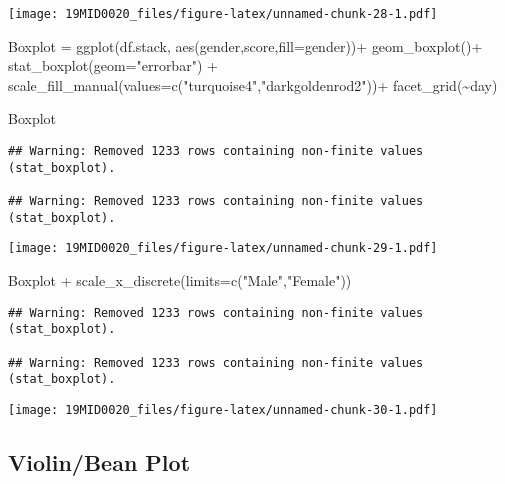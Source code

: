 \documentclass[
]{article}
\newenvironment{Shaded}{\begin{snugshade}}{\end{snugshade}}
\newcommand{\AttributeTok}[1]{\textcolor[rgb]{0.77,0.63,0.00}{#1}}
\newcommand{\FunctionTok}[1]{\textcolor[rgb]{0.00,0.00,0.00}{#1}}
\newcommand{\NormalTok}[1]{#1}
\newcommand{\OtherTok}[1]{\textcolor[rgb]{0.56,0.35,0.01}{#1}}
\newcommand{\SpecialCharTok}[1]{\textcolor[rgb]{0.00,0.00,0.00}{#1}}
\newcommand{\StringTok}[1]{\textcolor[rgb]{0.31,0.60,0.02}{#1}}
\begin{document}
\texttt{[image: 19MID0020\_files/figure-latex/unnamed-chunk-28-1.pdf]}

\begin{Shaded}
\begin{Highlighting}[]
\NormalTok{Boxplot }\OtherTok{=} \FunctionTok{ggplot}\NormalTok{(df.stack, }\FunctionTok{aes}\NormalTok{(gender,score,}\AttributeTok{fill=}\NormalTok{gender))}\SpecialCharTok{+}
          \FunctionTok{geom\_boxplot}\NormalTok{()}\SpecialCharTok{+}
          \FunctionTok{stat\_boxplot}\NormalTok{(}\AttributeTok{geom=}\StringTok{"errorbar"}\NormalTok{) }\SpecialCharTok{+} 
          \FunctionTok{scale\_fill\_manual}\NormalTok{(}\AttributeTok{values=}\FunctionTok{c}\NormalTok{(}\StringTok{"turquoise4"}\NormalTok{,}\StringTok{"darkgoldenrod2"}\NormalTok{))}\SpecialCharTok{+}
          \FunctionTok{facet\_grid}\NormalTok{(}\SpecialCharTok{\textasciitilde{}}\NormalTok{day)}

\NormalTok{Boxplot}
\end{Highlighting}
\end{Shaded}

\begin{verbatim}
## Warning: Removed 1233 rows containing non-finite values (stat_boxplot).

## Warning: Removed 1233 rows containing non-finite values (stat_boxplot).
\end{verbatim}

\texttt{[image: 19MID0020\_files/figure-latex/unnamed-chunk-29-1.pdf]}

\begin{Shaded}
\begin{Highlighting}[]
\NormalTok{Boxplot }\SpecialCharTok{+} \FunctionTok{scale\_x\_discrete}\NormalTok{(}\AttributeTok{limits=}\FunctionTok{c}\NormalTok{(}\StringTok{"Male"}\NormalTok{,}\StringTok{"Female"}\NormalTok{))}
\end{Highlighting}
\end{Shaded}

\begin{verbatim}
## Warning: Removed 1233 rows containing non-finite values (stat_boxplot).

## Warning: Removed 1233 rows containing non-finite values (stat_boxplot).
\end{verbatim}

\texttt{[image: 19MID0020\_files/figure-latex/unnamed-chunk-30-1.pdf]}

\hypertarget{violinbean-plot}{%
\subsection{Violin/Bean Plot}\label{violinbean-plot}}
\end{document}
